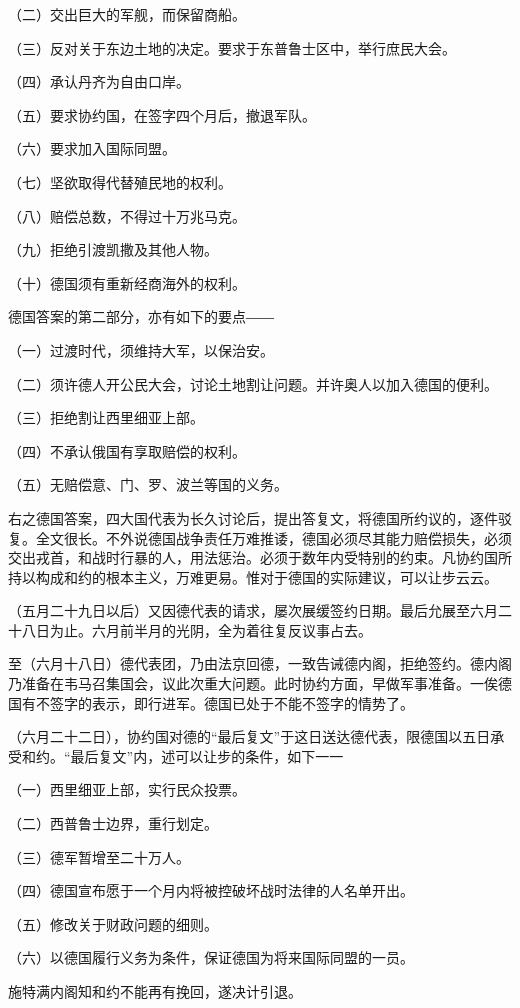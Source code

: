 （二）交出巨大的军舰，而保留商船。

（三）反对关于东边土地的决定。要求于东普鲁士区中，举行庶民大会。

（四）承认丹齐为自由口岸。

（五）要求协约国，在签字四个月后，撤退军队。

（六）要求加入国际同盟。

（七）坚欲取得代替殖民地的权利。

（八）赔偿总数，不得过十万兆马克。

（九）拒绝引渡凯撒及其他人物。

（十）德国须有重新经商海外的权利。

德国答案的第二部分，亦有如下的要点――

（一）过渡时代，须维持大军，以保治安。

（二）须许德人开公民大会，讨论土地割让问题。并许奥人以加入德国的便利。


（三）拒绝割让西里细亚上部。

（四）不承认俄国有享取赔偿的权利。

（五）无赔偿意、门、罗、波兰等国的义务。

右之德国答案，四大国代表为长久讨论后，提出答复文，将德国所约议的，逐件驳复。全文很长。不外说德国战争责任万难推诿，德国必须尽其能力赔偿损失，必须交出戎首，和战时行暴的人，用法惩治。必须于数年内受特别的约束。凡协约国所持以构成和约的根本主义，万难更易。惟对于德国的实际建议，可以让步云云。

（五月二十九日以后）又因德代表的请求，屡次展缓签约日期。最后允展至六月二十八日为止。六月前半月的光阴，全为着往复反议事占去。

至（六月十八日）德代表团，乃由法京回德，一致告诫德内阁，拒绝签约。德内阁乃准备在韦马召集国会，议此次重大问题。此时协约方面，早做军事准备。一俟德国有不签字的表示，即行进军。德国已处于不能不签字的情势了。

（六月二十二日），协约国对德的“最后复文”于这日送达德代表，限德国以五日承受和约。“最后复文”内，述可以让步的条件，如下一一

（一）西里细亚上部，实行民众投票。

（二）西普鲁士边界，重行划定。

（三）德军暂增至二十万人。

（四）德国宣布愿于一个月内将被控破坏战时法律的人名单开出。

（五）修改关于财政问题的细则。

（六）以德国履行义务为条件，保证德国为将来国际同盟的一员。

施特满内阁知和约不能再有挽回，遂决计引退。

